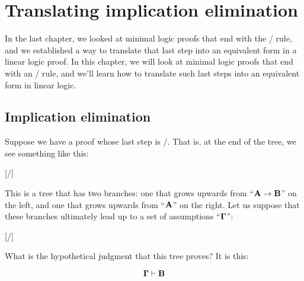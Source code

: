 \documentclass[../../../main.tex]{subfiles}
\begin{document}
\chapter{Translating implication elimination}

In the last chapter, we looked at minimal logic proofs that end with the \implIntro/ rule, and we established a way to translate that last step into an equivalent form in a linear logic proof. In this chapter, we will look at minimal logic proofs that end with an \implElim/ rule, and we'll learn how to translate such last steps into an equivalent form in linear logic.


\section{Implication elimination}

Suppose we have a proof whose last step is \implElim/. That is, at the end of the tree, we see something like this:

\begin{prooftree*}
  \hypo{}
  
  \hypo{}
  
  [\implElim/]{}
\end{prooftree*}

\noindent
This is a tree that has two branches: one that grows upwards from ``$\nd{A} \impl/ \nd{B}$'' on the left, and one that grows upwards from ``$\mathbf{A}$'' on the right. Let us suppose that these branches ultimately lead up to a set of assumptions ``$\nd{\context/}$'':

\begin{prooftree*}
  \hypo{}
  
  \hypo{}
  
  [\implElim/]{}
\end{prooftree*}

\noindent
What is the hypothetical judgment that this tree proves? It is this:

\begin{equation*}
  \nd{\context/} \ndturnstile/ \nd{B}
\end{equation*}
\end{document}
